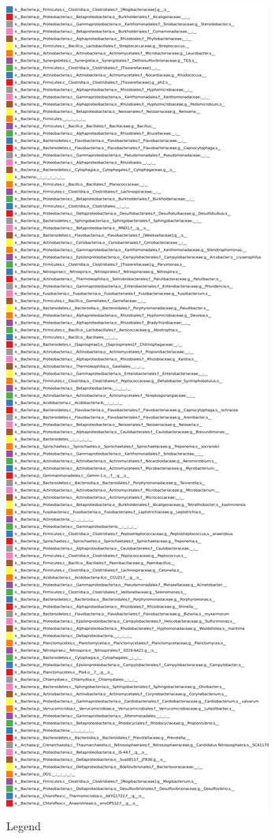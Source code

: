\documentclass{article}
\begin{document}
 \begin{figure}[h]
 	\centering
 	\includegraphics[scale=0.3547]{leg}  
 	\caption{Legend  }
 	\label{sup}
 \end{figure} 
\end{document}
